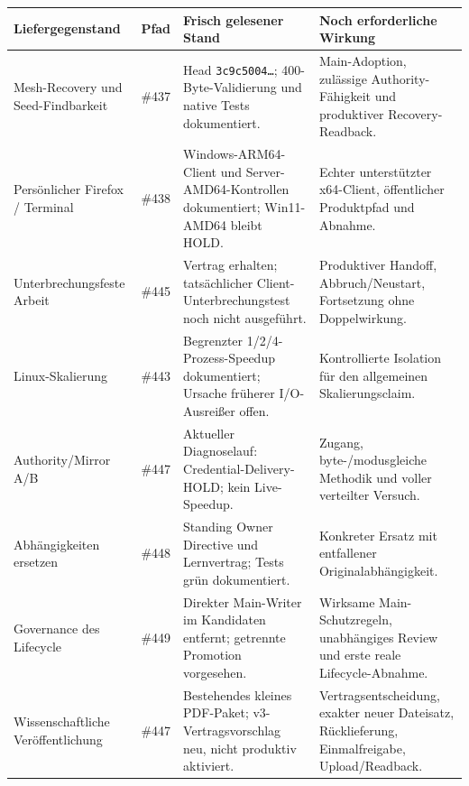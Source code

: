 \par
{\tighttable
\begin{tabularx}{\textwidth}{@{}p{31mm}p{18mm}Xp{49mm}@{}}\toprule
Liefergegenstand & Pfad & Frisch gelesener Stand & Noch erforderliche Wirkung\\\midrule
Mesh-Recovery und Seed-Findbarkeit & \#437 & Head \texttt{3c9c5004…}; 400-Byte-Validierung und native Tests dokumentiert. & Main-Adoption, zulässige Authority-Fähigkeit und produktiver Recovery-Readback.\\
Persönlicher Firefox / Terminal & \#438 & Windows-ARM64-Client und Server-AMD64-Kontrollen dokumentiert; Win11-AMD64 bleibt HOLD. & Echter unterstützter x64-Client, öffentlicher Produktpfad und Abnahme.\\
Unterbrechungsfeste Arbeit & \#445 & Vertrag erhalten; tatsächlicher Client-Unterbrechungstest noch nicht ausgeführt. & Produktiver Handoff, Abbruch/Neustart, Fortsetzung ohne Doppelwirkung.\\
Linux-Skalierung & \#443 & Begrenzter 1/2/4-Prozess-Speedup dokumentiert; Ursache früherer I/O-Ausreißer offen. & Kontrollierte Isolation für den allgemeinen Skalierungsclaim.\\
Authority/Mirror A/B & \#447 & Aktueller Diagnoselauf: Credential-Delivery-HOLD; kein Live-Speedup. & Zugang, byte-/modusgleiche Methodik und voller verteilter Versuch.\\
Abhängigkeiten ersetzen & \#448 & Standing Owner Directive und Lernvertrag; Tests grün dokumentiert. & Konkreter Ersatz mit entfallener Originalabhängigkeit.\\
Governance des Lifecycle & \#449 & Direkter Main-Writer im Kandidaten entfernt; getrennte Promotion vorgesehen. & Wirksame Main-Schutzregeln, unabhängiges Review und erste reale Lifecycle-Abnahme.\\
Wissenschaftliche Veröffentlichung & \#447 & Bestehendes kleines PDF-Paket; v3-Vertragsvorschlag neu, nicht produktiv aktiviert. & Vertragsentscheidung, exakter neuer Dateisatz, Rücklieferung, Einmalfreigabe, Upload/Readback.\\\bottomrule
\end{tabularx}}
